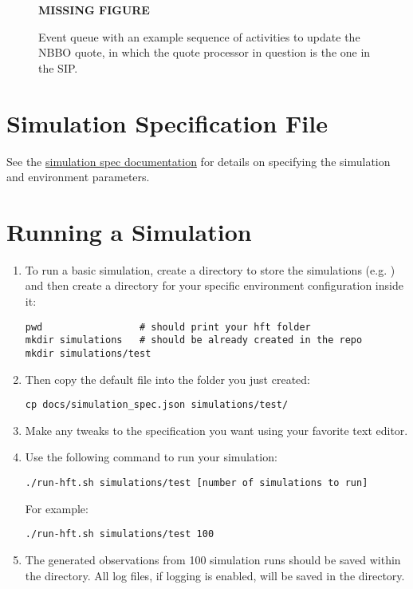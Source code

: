 \documentclass[11pt]{article}
\begin{document}
\begin{figure}
\textbf{MISSING FIGURE}%
\caption{Event queue with an example sequence of activities to update the NBBO quote, in which the quote processor in question is the one in the SIP.}
\label{fig:sim-sys}
\end{figure}

\section{Simulation Specification File}

See the \href{simulation_spec.pdf}{simulation spec documentation} for details on specifying the simulation and environment parameters.

\section{Running a Simulation}

\begin{enumerate}
\item To run a basic simulation, create a directory to store the
  simulations (e.g. ) and then create a directory for your
  specific environment configuration inside it:
%
\begin{verbatim}
pwd                 # should print your hft folder
mkdir simulations   # should be already created in the repo
mkdir simulations/test
\end{verbatim}

\item Then copy the default  file into the folder you just created:
%
\begin{verbatim}
cp docs/simulation_spec.json simulations/test/
\end{verbatim}

\item Make any tweaks to the specification you want using your favorite text editor.

\item Use the following command to run your simulation:
%
\begin{verbatim}
./run-hft.sh simulations/test [number of simulations to run]
\end{verbatim}

For example:
\begin{verbatim}
./run-hft.sh simulations/test 100
\end{verbatim}

\item The generated observations from 100 simulation runs should be saved within the  directory. All log files, if logging is enabled, will be saved in the  directory.

\end{enumerate}
\end{document}
